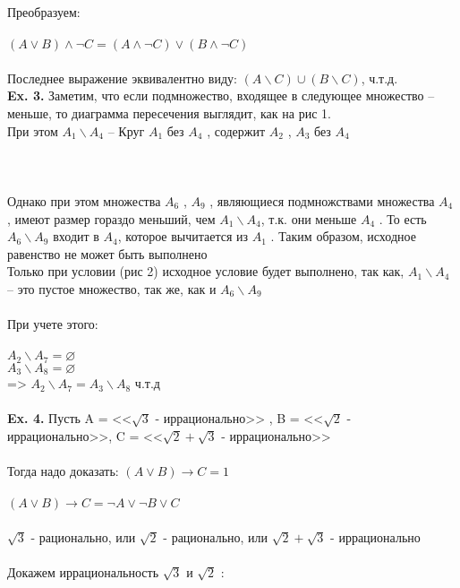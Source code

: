 \documentclass[a4paper,12pt]{article}
\begin{document}
Преобразуем:
\\
\\
$ (A \vee B) \wedge \neg C = (A \wedge \neg C) \vee (B \wedge \neg C) $
\\
\\
Последнее выражение эквивалентно виду: $ (A \backslash C) \cup (B \backslash C)$, ч.т.д.
\\
\newpage
\textbf{Ex. 3.}
Заметим, что если подмножество, входящее в следующее множество -- меньше, то диаграмма пересечения выглядит, как на рис 1.
\\
При этом $ A_1 \backslash A_4 $ --  Круг $ A_1 $ без $ A_4 $ , содержит $ A_2 $ , $ A_3 $ без  $ A_4 $
\\
\\
\\
\\
Однако при этом множества $ A_6 $ , $ A_9 $ , являющиеся подмножствами множества $ A_4 $ , имеют размер гораздо меньший, чем $ A_1 \backslash A_4 $, т.к. они меньше $ A_4 $ . То есть$ A_6 \backslash A_9 $ входит в $ A_4 $, которое вычитается из $ A_1 $ . Таким образом, исходное равенство не может быть выполнено
\\
Только при условии (рис 2) исходное условие будет выполнено, так как, $ A_1 \backslash A_4 $ -- это пустое множество, так же, как и $ A_6 \backslash A_9 $ 
\\
\\
При учете этого:
\\
\\
$ A_2 \backslash A_7 = \varnothing$
\\
$ A_3 \backslash A_8 = \varnothing$
\\
=> $ A_2 \backslash A_7 = A_3 \backslash A_8 $ \; ч.т.д
\\
\\
\textbf{Ex. 4.} Пусть A = <<$ \sqrt3 $ - иррационально>> , B = <<$ \sqrt2 $ - иррационально>>, C = <<$ \sqrt2 + \sqrt3 $ - иррационально>>
\\
\\
Тогда надо доказать: $(A \vee B) \longrightarrow C = 1$
\\
\\
$(A \vee B) \longrightarrow C = \neg A \vee \neg B \vee C$
\\
\\
$ \sqrt3 $ - рационально, или $ \sqrt2 $ - рационально, или $ \sqrt2 + \sqrt3 $ - иррационально
\\
\\
Докажем иррациональность $ \sqrt3 $ и $ \sqrt2 $ :
\end{document}
